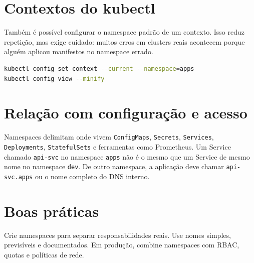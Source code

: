 \documentclass[11pt,a4paper]{article}
\begin{document}
\section*{\color{primary}Contextos do kubectl}

Também é possível configurar o namespace padrão de um contexto. Isso reduz repetição, mas exige cuidado: muitos erros em clusters reais acontecem porque alguém aplicou manifestos no namespace errado.

\begin{lstlisting}[language=bash]
kubectl config set-context --current --namespace=apps
kubectl config view --minify
\end{lstlisting}

\section*{\color{primary}Relação com configuração e acesso}

Namespaces delimitam onde vivem \texttt{ConfigMaps}, \texttt{Secrets}, \texttt{Services}, \texttt{Deployments}, \texttt{StatefulSets} e ferramentas como Prometheus. Um Service chamado \texttt{api-svc} no namespace \texttt{apps} não é o mesmo que um Service de mesmo nome no namespace \texttt{dev}. De outro namespace, a aplicação deve chamar \texttt{api-svc.apps} ou o nome completo do DNS interno.

\section*{\color{primary}Boas práticas}

Crie namespaces para separar responsabilidades reais. Use nomes simples, previsíveis e documentados. Em produção, combine namespaces com RBAC, quotas e políticas de rede.
\end{document}
